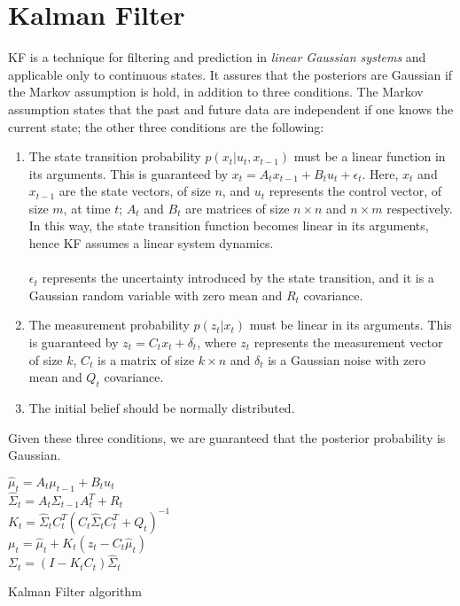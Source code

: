 \section{Kalman Filter}
\nocite{prob-robotics}
\ac{KF} is a technique for filtering and prediction in \emph{linear Gaussian systems} and applicable only to continuous states. It assures that the posteriors are Gaussian if the Markov assumption is hold, in addition to three conditions. The Markov assumption states that the past and future data are independent if one knows the current state; the other three conditions are the following:
\begin{enumerate}
    \item{The state transition probability $p\left( x_t | u_t, x_{t-1}\right)$ must be a linear function in its arguments. This is guaranteed by $ x_t = A_t x_{t-1} + B_t u_t + \epsilon_t $. Here, $x_t$ and $x_{t-1}$ are the state vectors, of size $n$, and $u_t$ represents the control vector, of size $m$, at time $t$; $A_t$ and $B_t$ are matrices of size $n \times n$ and $n\times m$ respectively. In this way, the state transition function becomes linear in its arguments, hence KF assumes a linear system dynamics. \\\\ $\epsilon_t$ represents the uncertainty introduced by the state transition, and it is a Gaussian random variable with zero mean and $R_t$ covariance.}
    \item{The measurement probability $p\left(z_t | x_t\right)$ must be linear in its arguments. This is guaranteed by $z_t = C_t x_t + \delta_t$, where $z_t$ represents the measurement vector of size $k$, $C_t$ is a matrix of size $k \times n$ and $\delta_t$ is a Gaussian noise with zero mean and $Q_t$ covariance.}
    \item{The initial belief should be normally distributed.}
\end{enumerate}
Given these three conditions, we are guaranteed that the posterior probability is Gaussian. \\

\begin{algorithm}[h]
    \BlankLine
    \BlankLine
    $\hat\mu_t = A_t \mu_{t-1} + B_t u_t$ \\
    $\hat\Sigma_t = A_t \Sigma_{t-1} A_t^T + R_t$ \\
    \BlankLine
    $K_t = \hat\Sigma_t C_t^T \left(C_t \hat\Sigma_t C_t^T + Q_t\right)^{-1}$ \\
    $\mu_t = \hat\mu_t + K_t \left(z_t - C_t \hat\mu_t \right) $ \\
    $\Sigma_t = (I - K_t C_t) \hat\Sigma_t$ \\
    \BlankLine
    \BlankLine

    \caption{Kalman Filter algorithm}
    \label{chapter1:kf:algorithm1}
\end{algorithm}

